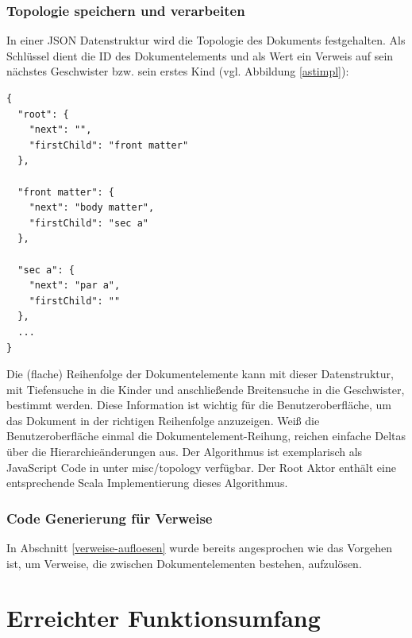  
\subsubsection{Topologie speichern und verarbeiten}\label{}

 
In einer JSON Datenstruktur wird die Topologie des Dokuments festgehalten. Als Schlüssel dient die ID des Dokumentelements und als Wert ein Verweis auf sein nächstes Geschwister bzw. sein erstes Kind (vgl. Abbildung \ref{astimpl}):

 
\begin{verbatim}
{
  "root": {
    "next": "",
    "firstChild": "front matter"
  },

  "front matter": {
    "next": "body matter",
    "firstChild": "sec a"
  },

  "sec a": {
    "next": "par a",
    "firstChild": ""
  },
  ...
}
\end{verbatim}
 
Die (flache) Reihenfolge der Dokumentelemente kann mit dieser Datenstruktur, mit Tiefensuche in die Kinder und anschließende Breitensuche in die Geschwister, bestimmt werden. Diese Information ist wichtig für die Benutzeroberfläche, um das Dokument in der richtigen Reihenfolge anzuzeigen. Weiß die Benutzeroberfläche einmal die Dokumentelement-Reihung, reichen einfache Deltas über die Hierarchieänderungen aus. Der Algorithmus ist exemplarisch als JavaScript Code in \citep{HodappScaltex} unter misc/topology verfügbar. Der Root Aktor enthält eine entsprechende Scala Implementierung dieses Algorithmus.

 
\subsubsection{Code Generierung für Verweise}\label{}

 
In Abschnitt \ref{verweise-aufloesen} wurde bereits angesprochen wie das Vorgehen ist, um Verweise, die zwischen Dokumentelementen bestehen, aufzulösen.

 
\section{Erreichter Funktionsumfang}\label{}
 
